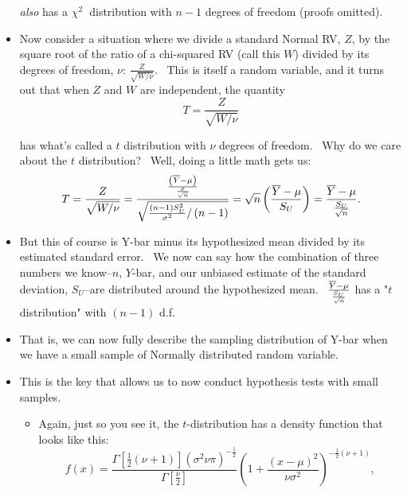 \documentclass[11pt]{article}
\begin{document}
\begin{itemize}
\textit{also} has a $\chi ^{2}$\textbf{\ }distribution with $n-1$ degrees of
freedom (proofs omitted).

\item Now consider a situation where we divide a standard Normal RV, $Z$, by
the square root of the ratio of a chi-squared RV (call this $W$) divided by
its degrees of freedom, $\nu $: $\frac{Z}{\sqrt{W/\nu }}$. \ This is itself
a random variable, and it turns out that when $Z$ and $W$ are independent,
the quantity 
\begin{equation*}
T=\frac{Z}{\sqrt{W/\nu }}
\end{equation*}

has what's called a $t$ distribution with $\nu $ degrees of freedom. \ Why
do we care about the $t$ distribution? \ Well, doing a little math gets us:%
\begin{equation*}
T=\frac{Z}{\sqrt{W/\nu }}=\frac{\frac{\left( \overline{Y}-\mu \right) }{%
\frac{\sigma }{\sqrt{n}}}}{\sqrt{\frac{\left( n-1\right) S_{U}^{2}}{\sigma
^{2}}/\left( n-1\right) }}=\sqrt{n}\left( \frac{\overline{Y}-\mu }{S_{U}}%
\right) =\frac{\overline{Y}-\mu }{\frac{S_{U}}{\sqrt{n}}}.
\end{equation*}

\item But this of course is Y-bar minus its hypothesized mean divided by its
estimated standard error. \ We now can say how the combination of three
numbers we know--$n$, $Y$-bar, and our unbiased estimate of the standard
deviation, $S_{U}$--are distributed around the hypothesized mean. \ $\frac{%
\overline{Y}-\mu }{\frac{S_{U}}{\sqrt{n}}}$ has a "$t$ distribution" with $%
\left( n-1\right) $ d.f. \ 

\item That is, we can now fully describe the sampling distribution of Y-bar
when we have a small sample of Normally distributed random variable. \ 

\item This is the key that allows us to now conduct hypothesis tests with
small samples.

\begin{itemize}
\item Again, just so you see it, the $t$-distribution has a density function
that looks like this:%
\begin{equation*}
f(x)=\frac{\Gamma \left[ \frac{1}{2}\left( \nu +1\right) \right] \left(
\sigma ^{2}\nu \pi \right) ^{-\frac{1}{2}}}{\Gamma \left[ \frac{\nu }{2}%
\right] }\left( 1+\frac{\left( x-\mu \right) ^{2}}{\nu \sigma ^{2}}\right)
^{-\frac{1}{2}\left( \nu +1\right) },
\end{equation*}


\end{itemize}
\end{itemize}
\end{document}
